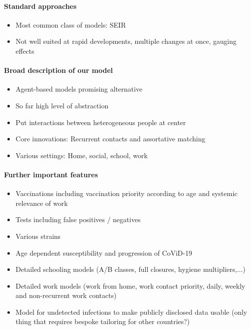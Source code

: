 \paragraph{Standard approaches }
\begin{itemize}
    \item Most common class of models: SEIR
    \item Not well suited at rapid developments, multiple changes at once, gauging effects
\end{itemize}

\paragraph{Broad description of our model}
\begin{itemize}
    \item Agent-based models promising alternative
    \item So far high level of abstraction
    \item Put interactions between heterogeneous people at center
    \item Core innovations: Recurrent contacts and assortative matching
    \item Various settings: Home, social, school, work
\end{itemize}

\paragraph{Further important features }
\begin{itemize}
    \item Vaccinations including vaccination priority according to age and systemic relevance of work
    \item Tests including false positives / negatives
    \item Various strains
    \item Age dependent susceptibility and progression of CoViD-19
    \item Detailed schooling models (A/B classes, full closures, hygiene multipliers,...)
    \item Detailed work models (work from home, work contact priority, daily, weekly and non-recurrent work contacts)
    \item Model for undetected infections to make publicly disclosed data usable (only thing that requires bespoke tailoring for other countries?)
\end{itemize}

